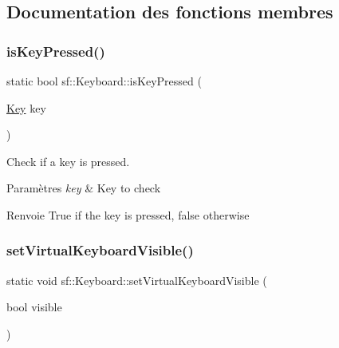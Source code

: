\subsection{Documentation des fonctions membres}
\mbox{\label{classsf_1_1Keyboard_a80a04b2f53005886957f49eee3531599}} 
\subsubsection{\texorpdfstring{is\+Key\+Pressed()}{isKeyPressed()}}
{\footnotesize\ttfamily static bool sf\+::\+Keyboard\+::is\+Key\+Pressed (\begin{DoxyParamCaption}\item[{\hyperlink{classsf_1_1Keyboard_acb4cacd7cc5802dec45724cf3314a142}{Key}}]{key }\end{DoxyParamCaption})\hspace{0.3cm}{\ttfamily [static]}}



Check if a key is pressed. 


\begin{DoxyParams}{Paramètres}
{\em key} & Key to check\\
\hline
\end{DoxyParams}
\begin{DoxyReturn}{Renvoie}
True if the key is pressed, false otherwise 
\end{DoxyReturn}
\mbox{\label{classsf_1_1Keyboard_ad61fee7e793242d444a8c5acd662fe5b}} 
\subsubsection{\texorpdfstring{set\+Virtual\+Keyboard\+Visible()}{setVirtualKeyboardVisible()}}
{\footnotesize\ttfamily static void sf\+::\+Keyboard\+::set\+Virtual\+Keyboard\+Visible (\begin{DoxyParamCaption}\item[{bool}]{visible }\end{DoxyParamCaption})\hspace{0.3cm}{\ttfamily [static]}}



